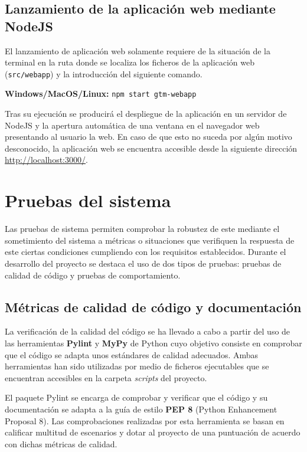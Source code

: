 \subsection{Lanzamiento de la aplicación web mediante NodeJS}

El lanzamiento de aplicación web solamente requiere de la situación de la terminal en la ruta donde se localiza los ficheros de la aplicación web (\texttt{src/webapp}) y la introducción del siguiente comando. 

\vspace{0.5cm}
\centerline{\textbf{Windows/MacOS/Linux: } \texttt{npm start gtm-webapp}}
\vspace{0.4cm}

Tras su ejecución se producirá el despliegue de la aplicación en un servidor de NodeJS y la apertura automática de una ventana en el navegador web presentando al usuario la web. En caso de que esto no suceda por algún motivo desconocido, la aplicación web se encuentra accesible desde la siguiente dirección \url{http://localhost:3000/}.

\section{Pruebas del sistema}

Las pruebas de sistema permiten comprobar la robustez de este mediante el sometimiento del sistema a métricas o situaciones que verifiquen la respuesta de este ciertas condiciones cumpliendo con los requisitos establecidos. Durante el desarrollo del proyecto se destaca el uso de dos tipos de pruebas: pruebas de calidad de código y pruebas de comportamiento. 

\subsection{Métricas de calidad de código y documentación}

La verificación de la calidad del código se ha llevado a cabo a partir del uso de las herramientas \textbf{Pylint} y \textbf{MyPy} de Python cuyo objetivo consiste en comprobar que el código se adapta unos estándares de calidad adecuados. Ambas herramientas han sido utilizadas por medio de ficheros ejecutables que se encuentran accesibles en la carpeta \textit{scripts} del proyecto.

El paquete Pylint se encarga de comprobar y verificar que el código y su documentación se adapta a la guía de estilo \textbf{PEP 8} (Python Enhancement Proposal 8). Las comprobaciones realizadas por esta herramienta se basan en calificar multitud de escenarios y dotar al proyecto de una puntuación de acuerdo con dichas métricas de calidad.

